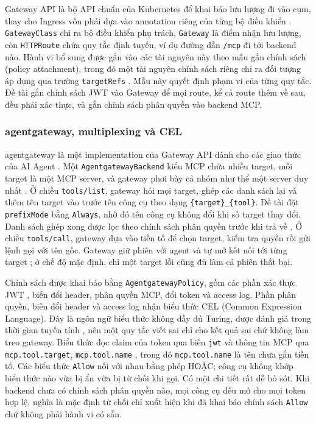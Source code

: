 Gateway API là bộ API chuẩn của Kubernetes để khai báo lưu lượng đi vào cụm, thay cho Ingress vốn phải dựa vào annotation riêng của từng bộ điều khiển \parencite{gatewayapi,k8s_ingress}. \texttt{GatewayClass} chỉ ra bộ điều khiển phụ trách, \texttt{Gateway} là điểm nhận lưu lượng, còn \texttt{HTTPRoute} chứa quy tắc định tuyến, ví dụ đường dẫn \texttt{/mcp} đi tới backend nào. Hành vi bổ sung được gắn vào các tài nguyên này theo mẫu gắn chính sách (policy attachment), trong đó một tài nguyên chính sách riêng chỉ ra đối tượng áp dụng qua trường \texttt{targetRefs} \parencite{gep713}. Mẫu này quyết định phạm vi của từng quy tắc. Đề tài gắn chính sách JWT vào Gateway để mọi route, kể cả route thêm về sau, đều phải xác thực, và gắn chính sách phân quyền vào backend MCP.

\subsubsection{agentgateway, multiplexing và CEL}

agentgateway là một implementation của Gateway API dành cho các giao thức của AI Agent \parencite{agentgateway}. Một \texttt{AgentgatewayBackend} kiểu MCP chứa nhiều target, mỗi target là một MCP server, và gateway phơi bày cả nhóm như thể một server duy nhất \parencite{agw_virtual}. Ở chiều \texttt{tools/list}, gateway hỏi mọi target, ghép các danh sách lại và thêm tên target vào trước tên công cụ theo dạng \texttt{\{target\}\_\{tool\}}. Đề tài đặt \texttt{prefixMode} bằng \texttt{Always}, nhờ đó tên công cụ không đổi khi số target thay đổi. Danh sách ghép xong được lọc theo chính sách phân quyền trước khi trả về \parencite{agw_toolaccess}. Ở chiều \texttt{tools/call}, gateway dựa vào tiền tố để chọn target, kiểm tra quyền rồi gửi lệnh gọi với tên gốc. Gateway giữ phiên với agent và tự mở kết nối tới từng target \parencite{agw_session}; ở chế độ mặc định, chỉ một target lỗi cũng đủ làm cả phiên thất bại.

Chính sách được khai báo bằng \texttt{AgentgatewayPolicy}, gồm các phần xác thực JWT \parencite{agw_jwt}, biến đổi header, phân quyền MCP, đổi token \parencite{agw_tokenexchange} và access log. Phần phân quyền, biến đổi header và access log nhận biểu thức CEL (Common Expression Language). Đây là ngôn ngữ biểu thức không đầy đủ Turing, được đánh giá trong thời gian tuyến tính \parencite{cel_spec}, nên một quy tắc viết sai chỉ cho kết quả sai chứ không làm treo gateway. Biểu thức đọc claim của token qua biến \texttt{jwt} và thông tin MCP qua \texttt{mcp.tool.target}, \texttt{mcp.tool.name} \parencite{agw_cel}, trong đó \texttt{mcp.tool.name} là tên chưa gắn tiền tố. Các biểu thức \texttt{Allow} nối với nhau bằng phép HOẶC; công cụ không khớp biểu thức nào vừa bị ẩn vừa bị từ chối khi gọi. Có một chi tiết rất dễ bỏ sót. Khi backend chưa có chính sách phân quyền nào, mọi công cụ đều mở cho mọi token hợp lệ, nghĩa là mặc định từ chối chỉ xuất hiện khi đã khai báo chính sách \texttt{Allow} chứ không phải hành vi có sẵn.

